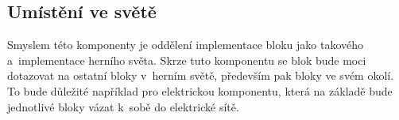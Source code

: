 \subsection{Umístění ve světě}

Smyslem této komponenty je oddělení implementace bloku jako takového a~implementace herního světa. Skrze tuto komponentu se blok bude moci dotazovat na ostatní bloky v~herním světě, především pak bloky ve svém okolí. To bude důležité například pro elektrickou komponentu, která na základě  bude jednotlivé bloky vázat k~sobě do elektrické sítě.






